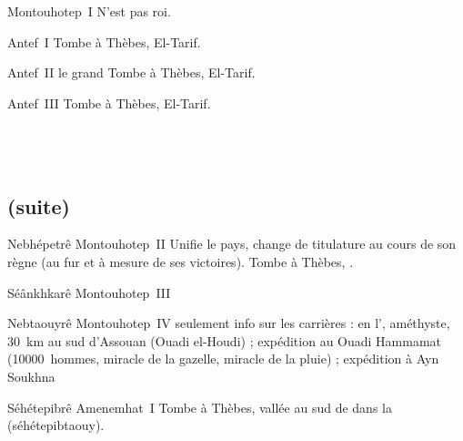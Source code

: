 \noi{}

\begin{listerois}
  \item [Montouhotep~I] N'est pas roi.
  \item [Antef~I] Tombe à Thèbes, El-Tarif.
  \item [Antef~II le grand] Tombe à Thèbes, El-Tarif. \\
  \item [Antef~III] Tombe à Thèbes, El-Tarif.
\end{listerois}

\section{\MK}

\noi{} \\


\subsection{\texorpdfstring{}{XIe dynastie} (suite)}

\begin{listerois}
  \item [Nebhépetrê Montouhotep~II] Unifie le pays, change 
        de titulature au cours de son règne (au fur et à mesure de ses 
        victoires). Tombe à Thèbes, \DeB.
  \item [Séânkhkarê Montouhotep~III]
  \item [Nebtaouyrê Montouhotep~IV] seulement info sur les carrières : 
        en l', améthyste, \SI{30}{\km} au sud d'Assouan (Ouadi 
        el-Houdi) ; 
        expédition au Ouadi Hammamat (\num{10000}~hommes, miracle de 
        la gazelle, miracle de la pluie) ;
        expédition à Ayn Soukhna
  \item [Séhétepibrê Amenemhat~I] Tombe à Thèbes, vallée au sud 
        de \DeB dans la 
        (séhétepibtaouy).
\end{listerois}

\subsection{\texorpdfstring{}{XIIe dynastie}}

